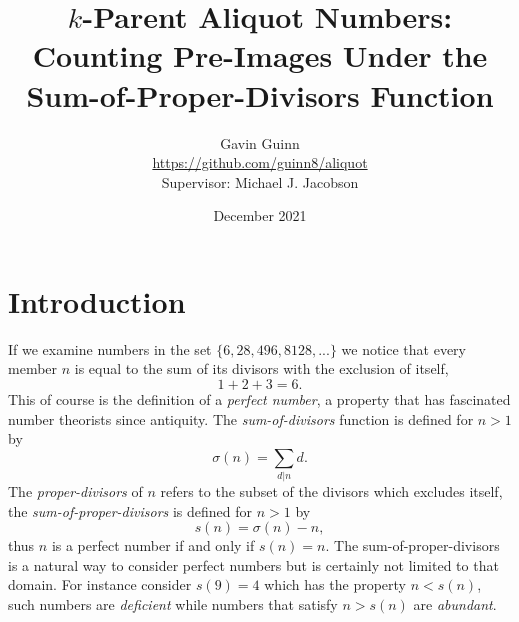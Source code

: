 \documentclass{article}
\title{$k$-Parent Aliquot Numbers: Counting Pre-Images Under the Sum-of-Proper-Divisors Function}
\author{Gavin Guinn\\\url{https://github.com/guinn8/aliquot}\\{ Supervisor: Michael J. Jacobson}}
\date{December 2021}
\theoremstyle{definition}
\begin{document}
\maketitle

\section{Introduction}
If we examine numbers in the set $\{6, 28, 496, 8128, ...\}$ we notice that every member $n$ is equal to the sum of its divisors  with the exclusion of itself,
$$1+2+3 = 6.$$
This of course is the definition of a \textit{perfect number}, a property that has fascinated number theorists since antiquity. The \textit{sum-of-divisors} function is defined for $n > 1$ by
$$\sigma(n) = \sum_{d|n} d.$$
The \textit{proper-divisors} of $n$ refers to the subset of the divisors which excludes itself, the \textit{sum-of-proper-divisors} is defined for $n > 1$ by
$$s(n) = \sigma(n) - n,$$
thus $n$ is a perfect number if and only if $s(n) = n$. The sum-of-proper-divisors is a natural way to consider perfect numbers but is certainly not limited to that domain. For instance consider $s(9) = 4$ which has the property $n < s(n)$, such numbers are \textit{deficient} while numbers that satisfy $n > s(n)$ are \textit{abundant}.
\end{document}
